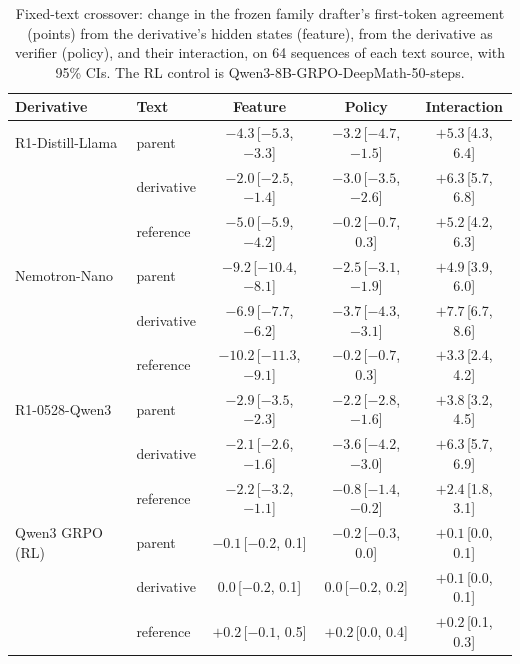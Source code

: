 \documentclass[11pt]{article}
\begin{document}
\begin{table}[t]
  \centering
  \small
  \setlength{\tabcolsep}{6pt}
  \begin{tabular}{@{}llccc@{}}
    \toprule
    Derivative & Text & Feature & Policy & Interaction \\
    \midrule
    R1-Distill-Llama & parent & $-4.3$\,{\scriptsize[$-5.3$, $-3.3$]} & $-3.2$\,{\scriptsize[$-4.7$, $-1.5$]} & $+5.3$\,{\scriptsize[4.3, 6.4]} \\
     & derivative & $-2.0$\,{\scriptsize[$-2.5$, $-1.4$]} & $-3.0$\,{\scriptsize[$-3.5$, $-2.6$]} & $+6.3$\,{\scriptsize[5.7, 6.8]} \\
     & reference & $-5.0$\,{\scriptsize[$-5.9$, $-4.2$]} & $-0.2$\,{\scriptsize[$-0.7$, 0.3]} & $+5.2$\,{\scriptsize[4.2, 6.3]} \\
    \midrule
    Nemotron-Nano & parent & $-9.2$\,{\scriptsize[$-10.4$, $-8.1$]} & $-2.5$\,{\scriptsize[$-3.1$, $-1.9$]} & $+4.9$\,{\scriptsize[3.9, 6.0]} \\
     & derivative & $-6.9$\,{\scriptsize[$-7.7$, $-6.2$]} & $-3.7$\,{\scriptsize[$-4.3$, $-3.1$]} & $+7.7$\,{\scriptsize[6.7, 8.6]} \\
     & reference & $-10.2$\,{\scriptsize[$-11.3$, $-9.1$]} & $-0.2$\,{\scriptsize[$-0.7$, 0.3]} & $+3.3$\,{\scriptsize[2.4, 4.2]} \\
    \midrule
    R1-0528-Qwen3 & parent & $-2.9$\,{\scriptsize[$-3.5$, $-2.3$]} & $-2.2$\,{\scriptsize[$-2.8$, $-1.6$]} & $+3.8$\,{\scriptsize[3.2, 4.5]} \\
     & derivative & $-2.1$\,{\scriptsize[$-2.6$, $-1.6$]} & $-3.6$\,{\scriptsize[$-4.2$, $-3.0$]} & $+6.3$\,{\scriptsize[5.7, 6.9]} \\
     & reference & $-2.2$\,{\scriptsize[$-3.2$, $-1.1$]} & $-0.8$\,{\scriptsize[$-1.4$, $-0.2$]} & $+2.4$\,{\scriptsize[1.8, 3.1]} \\
    \midrule
    Qwen3 GRPO (RL) & parent & $-0.1$\,{\scriptsize[$-0.2$, 0.1]} & $-0.2$\,{\scriptsize[$-0.3$, 0.0]} & $+0.1$\,{\scriptsize[0.0, 0.1]} \\
     & derivative & $0.0$\,{\scriptsize[$-0.2$, 0.1]} & $0.0$\,{\scriptsize[$-0.2$, 0.2]} & $+0.1$\,{\scriptsize[0.0, 0.1]} \\
     & reference & $+0.2$\,{\scriptsize[$-0.1$, 0.5]} & $+0.2$\,{\scriptsize[0.0, 0.4]} & $+0.2$\,{\scriptsize[0.1, 0.3]} \\
    \bottomrule
  \end{tabular}
  \caption{Fixed-text crossover: change in the frozen family drafter's first-token agreement (points) from the derivative's hidden states (feature), from the derivative as verifier (policy), and their interaction, on 64 sequences of each text source, with 95\% CIs. The RL control is Qwen3-8B-GRPO-DeepMath-50-steps.}
  \label{tab:crossover}
\end{table}
\end{document}
